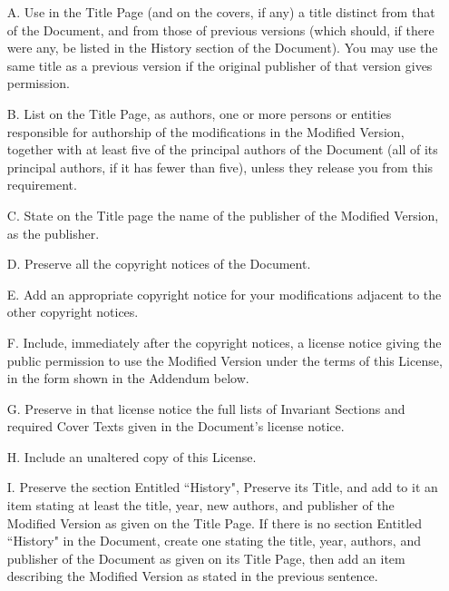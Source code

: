 \documentclass[12pt]{book}
\numberwithin{exc}{section}
\numberwithin{figure}{section}
\numberwithin{equation}{theorem}
\begin{document}
\begin{itemize}
\item[A.] 
   Use in the Title Page (and on the covers, if any) a title distinct
   from that of the Document, and from those of previous versions
   (which should, if there were any, be listed in the History section
   of the Document).  You may use the same title as a previous version
   if the original publisher of that version gives permission.
   
\item[B.]
   List on the Title Page, as authors, one or more persons or entities
   responsible for authorship of the modifications in the Modified
   Version, together with at least five of the principal authors of the
   Document (all of its principal authors, if it has fewer than five),
   unless they release you from this requirement.
   
\item[C.]
   State on the Title page the name of the publisher of the
   Modified Version, as the publisher.
   
\item[D.]
   Preserve all the copyright notices of the Document.
   
\item[E.]
   Add an appropriate copyright notice for your modifications
   adjacent to the other copyright notices.
   
\item[F.]
   Include, immediately after the copyright notices, a license notice
   giving the public permission to use the Modified Version under the
   terms of this License, in the form shown in the Addendum below.
   
\item[G.]
   Preserve in that license notice the full lists of Invariant Sections
   and required Cover Texts given in the Document's license notice.
   
\item[H.]
   Include an unaltered copy of this License.
   
\item[I.]
   Preserve the section Entitled ``History", Preserve its Title, and add
   to it an item stating at least the title, year, new authors, and
   publisher of the Modified Version as given on the Title Page.  If
   there is no section Entitled ``History" in the Document, create one
   stating the title, year, authors, and publisher of the Document as
   given on its Title Page, then add an item describing the Modified
   Version as stated in the previous sentence.
   

\end{itemize}
\end{document}
